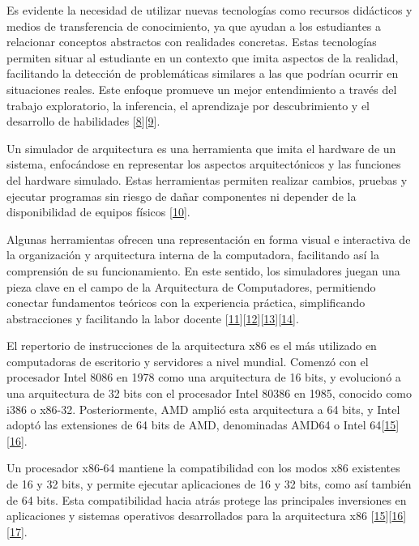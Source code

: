 \documentclass[12pt,twoside]{templates/unerthesis}
\begin{document}
Es evidente la necesidad de utilizar nuevas tecnologías como recursos didácticos y medios de transferencia de conocimiento, ya que ayudan a los estudiantes a relacionar conceptos abstractos con realidades concretas. Estas tecnologías permiten situar al estudiante en un contexto que imita aspectos de la realidad, facilitando la detección de problemáticas similares a las que podrían ocurrir en situaciones reales. Este enfoque promueve un mejor entendimiento a través del trabajo exploratorio, la inferencia, el aprendizaje por descubrimiento y el desarrollo de habilidades {[}\protect\hyperlink{ref-nova_tool_2013}{8}{]}{[}\protect\hyperlink{ref-mustafa_evaluating_2010}{9}{]}.

Un simulador de arquitectura es una herramienta que imita el hardware de un sistema, enfocándose en representar los aspectos arquitectónicos y las funciones del hardware simulado. Estas herramientas permiten realizar cambios, pruebas y ejecutar programas sin riesgo de dañar componentes ni depender de la disponibilidad de equipos físicos {[}\protect\hyperlink{ref-radivojevic_design_2011}{10}{]}.

Algunas herramientas ofrecen una representación en forma visual e interactiva de la organización y arquitectura interna de la computadora, facilitando así la comprensión de su funcionamiento. En este sentido, los simuladores juegan una pieza clave en el campo de la Arquitectura de Computadores, permitiendo conectar fundamentos teóricos con la experiencia práctica, simpliﬁcando abstracciones y facilitando la labor docente {[}\protect\hyperlink{ref-nikolic_survey_2009}{11}{]}{[}\protect\hyperlink{ref-hasan_survey_2012}{12}{]}{[}\protect\hyperlink{ref-hennessy_computer_2012}{13}{]}{[}\protect\hyperlink{ref-stallings_computer_2013}{14}{]}.

El repertorio de instrucciones de la arquitectura x86 es el más utilizado en computadoras de escritorio y servidores a nivel mundial. Comenzó con el procesador Intel 8086 en 1978 como una arquitectura de 16 bits, y evolucionó a una arquitectura de 32 bits con el procesador Intel 80386 en 1985, conocido como i386 o x86-32. Posteriormente, AMD amplió esta arquitectura a 64 bits, y Intel adoptó las extensiones de 64 bits de AMD, denominadas AMD64 o Intel 64{[}\protect\hyperlink{ref-intel_64_2016}{15}{]}{[}\protect\hyperlink{ref-amd_developer_2019}{16}{]}.

Un procesador x86-64 mantiene la compatibilidad con los modos x86 existentes de 16 y 32 bits, y permite ejecutar aplicaciones de 16 y 32 bits, como así también de 64 bits. Esta compatibilidad hacia atrás protege las principales inversiones en aplicaciones y sistemas operativos desarrollados para la arquitectura x86 {[}\protect\hyperlink{ref-intel_64_2016}{15}{]}{[}\protect\hyperlink{ref-amd_developer_2019}{16}{]}{[}\protect\hyperlink{ref-abel_ibm_2000}{17}{]}.
\end{document}

